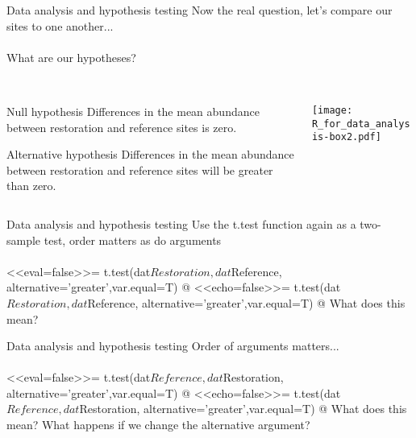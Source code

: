 \documentclass[xcolor=svgnames]{beamer}
\begin{document}
\begin{frame}{Data analysis and hypothesis testing}
Now the real question, let's compare our sites to one another...\\~\\
What are our hypotheses?\\~\\
\pause
\begin{columns}
\begin{column}{0.5\textwidth}
\begin{block}{Null hypothesis}
Differences in the mean abundance between restoration and reference sites is zero.
\end{block}
\pause
\vspace{0.2in}
\begin{block}{Alternative hypothesis}
Differences in the mean abundance between restoration and reference sites will be greater than zero.
\end{block}
\end{column}
\begin{column}{0.5\textwidth}
\pause
\centerline{\texttt{[image: R\_for\_data\_analysis-box2.pdf]}}
\end{column}
\end{columns}
\end{frame}

\begin{frame}[fragile]{Data analysis and hypothesis testing}
Use the t.test function again as a two-sample test, order matters as do arguments\\~\\
<<eval=false>>=
t.test(dat$Restoration,dat$Reference,
	alternative='greater',var.equal=T)
@
\pause
\small
<<echo=false>>=
t.test(dat$Restoration,dat$Reference,
	alternative='greater',var.equal=T)
@
\normalsize
\pause
What does this mean?
\end{frame}

\begin{frame}[fragile]{Data analysis and hypothesis testing}
Order of arguments matters...\\~\\
<<eval=false>>=
t.test(dat$Reference,dat$Restoration,
	alternative='greater',var.equal=T)
@
\pause
\small
<<echo=false>>=
t.test(dat$Reference,dat$Restoration,
	alternative='greater',var.equal=T)
@
\normalsize
\pause
What does this mean? \pause What happens if we change the alternative argument?
\end{frame}
\end{document}
